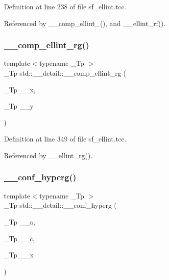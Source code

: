Definition at line 238 of file sf\+\_\+ellint.\+tcc.



Referenced by \+\_\+\+\_\+comp\+\_\+ellint\+\_(), and \+\_\+\+\_\+ellint\+\_\+rf().

\mbox{\label{namespacestd_1_1____detail_a31bb5a6e359c88b5bece8dd73f76a2f9}} 
\subsubsection{\texorpdfstring{\+\_\+\+\_\+comp\+\_\+ellint\+\_\+rg()}{\_\_comp\_ellint\_rg()}}
{\footnotesize\ttfamily template$<$typename \+\_\+\+Tp $>$ \\
\+\_\+\+Tp std\+::\+\_\+\+\_\+detail\+::\+\_\+\+\_\+comp\+\_\+ellint\+\_\+rg (\begin{DoxyParamCaption}\item[{\+\_\+\+Tp}]{\+\_\+\+\_\+x,  }\item[{\+\_\+\+Tp}]{\+\_\+\+\_\+y }\end{DoxyParamCaption})}



Definition at line 349 of file sf\+\_\+ellint.\+tcc.



Referenced by \+\_\+\+\_\+ellint\+\_\+rg().

\mbox{\label{namespacestd_1_1____detail_a3cb3151857e9ac01bc442c90301365ee}} 
\subsubsection{\texorpdfstring{\+\_\+\+\_\+conf\+\_\+hyperg()}{\_\_conf\_hyperg()}}
{\footnotesize\ttfamily template$<$typename \+\_\+\+Tp $>$ \\
\+\_\+\+Tp std\+::\+\_\+\+\_\+detail\+::\+\_\+\+\_\+conf\+\_\+hyperg (\begin{DoxyParamCaption}\item[{\+\_\+\+Tp}]{\+\_\+\+\_\+a,  }\item[{\+\_\+\+Tp}]{\+\_\+\+\_\+c,  }\item[{\+\_\+\+Tp}]{\+\_\+\+\_\+x }\end{DoxyParamCaption})}



